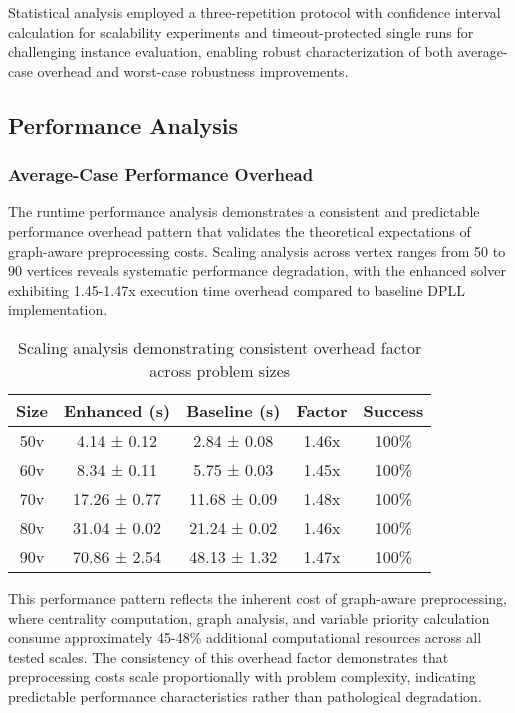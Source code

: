 Statistical analysis employed a three-repetition protocol with confidence interval calculation for scalability experiments and timeout-protected single runs for challenging instance evaluation, enabling robust characterization of both average-case overhead and worst-case robustness improvements.

\subsection{Performance Analysis}

\subsubsection{Average-Case Performance Overhead}

The runtime performance analysis demonstrates a consistent and predictable performance overhead pattern that validates the theoretical expectations of graph-aware preprocessing costs. Scaling analysis across vertex ranges from 50 to 90 vertices reveals systematic performance degradation, with the enhanced solver exhibiting 1.45-1.47x execution time overhead compared to baseline DPLL implementation.

\begin{table}[h]
\centering
\small
\begin{tabular}{|c|c|c|c|c|}
\hline
\textbf{Size} & \textbf{Enhanced (s)} & \textbf{Baseline (s)} & \textbf{Factor} & \textbf{Success} \\
\hline
50v & 4.14 ± 0.12 & 2.84 ± 0.08 & 1.46x & 100\% \\
60v & 8.34 ± 0.11 & 5.75 ± 0.03 & 1.45x & 100\% \\
70v & 17.26 ± 0.77 & 11.68 ± 0.09 & 1.48x & 100\% \\
80v & 31.04 ± 0.02 & 21.24 ± 0.02 & 1.46x & 100\% \\
90v & 70.86 ± 2.54 & 48.13 ± 1.32 & 1.47x & 100\% \\
\hline
\end{tabular}
\caption{Scaling analysis demonstrating consistent overhead factor across problem sizes}
\label{tab:scaling_performance}
\end{table}

This performance pattern reflects the inherent cost of graph-aware preprocessing, where centrality computation, graph analysis, and variable priority calculation consume approximately 45-48\% additional computational resources across all tested scales. The consistency of this overhead factor demonstrates that preprocessing costs scale proportionally with problem complexity, indicating predictable performance characteristics rather than pathological degradation.

